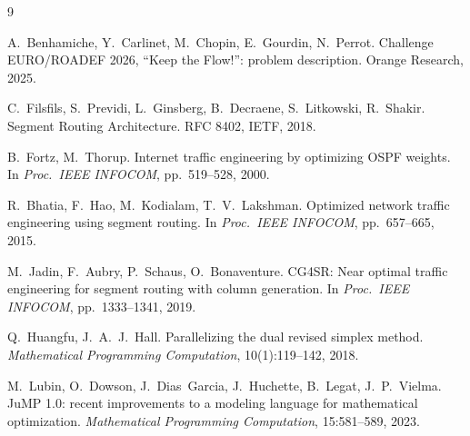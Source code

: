 \documentclass[11pt,a4paper]{article}
\begin{document}
\begin{thebibliography}{9}
\setlength{\itemsep}{0pt}
\small

A.~Benhamiche, Y.~Carlinet, M.~Chopin, E.~Gourdin, N.~Perrot.
\newblock Challenge EURO/ROADEF 2026, ``Keep the Flow!'': problem description.
\newblock Orange Research, 2025.

C.~Filsfils, S.~Previdi, L.~Ginsberg, B.~Decraene, S.~Litkowski, R.~Shakir.
\newblock Segment Routing Architecture.
\newblock RFC 8402, IETF, 2018.

B.~Fortz, M.~Thorup.
\newblock Internet traffic engineering by optimizing OSPF weights.
\newblock In \emph{Proc.\ IEEE INFOCOM}, pp.~519--528, 2000.

R.~Bhatia, F.~Hao, M.~Kodialam, T.~V.~Lakshman.
\newblock Optimized network traffic engineering using segment routing.
\newblock In \emph{Proc.\ IEEE INFOCOM}, pp.~657--665, 2015.

M.~Jadin, F.~Aubry, P.~Schaus, O.~Bonaventure.
\newblock CG4SR: Near optimal traffic engineering for segment routing with column generation.
\newblock In \emph{Proc.\ IEEE INFOCOM}, pp.~1333--1341, 2019.

Q.~Huangfu, J.~A.~J.~Hall.
\newblock Parallelizing the dual revised simplex method.
\newblock \emph{Mathematical Programming Computation}, 10(1):119--142, 2018.

M.~Lubin, O.~Dowson, J.~Dias~Garcia, J.~Huchette, B.~Legat, J.~P.~Vielma.
\newblock JuMP 1.0: recent improvements to a modeling language for mathematical optimization.
\newblock \emph{Mathematical Programming Computation}, 15:581--589, 2023.

\end{thebibliography}
\end{document}
